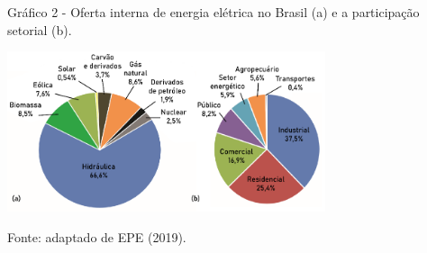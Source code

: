 \begin{onehalfspace}
        \begin{graph}
            \par \small Gráfico 2 - Oferta interna de energia elétrica no Brasil (a) e a participação setorial (b).
            \begin{minipage}[ht]{1\textwidth}\centering
                \includegraphics[width=0.7\textwidth]{graphs/graph1.png}            
            \end{minipage}
            \begin{flushleft}
                \par \small Fonte: adaptado de EPE (2019).            
            \end{flushleft}
        \end{graph}\pagebreak
    

\end{onehalfspace}

